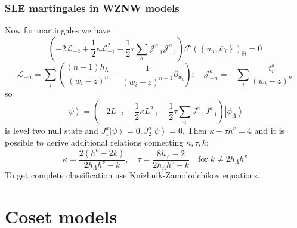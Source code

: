 \documentclass[pdftex]{beamer}
\theoremstyle{definition} \newtheorem{Def}{Definition}
\begin{document}
\begin{frame}
  \frametitle{SLE martingales in WZNW models}
  Now for martingales we have
  \begin{equation*}
    \left(-2 \mathcal{L}_{-2}+\frac{1}{2}\kappa \mathcal{L}_{-1}^{2}+\frac{1}{2}\tau\sum_{a} \mathcal{J}^{a}_{-1} \mathcal{J}^{a}_{-1}\right)        \mathcal{F}(\left\{w_{i}, \bar w_{i}\right\})_{\mathbb{H}}=0
  \end{equation*}
  \begin{equation*}
    \mathcal{L}_{-n}=\sum_{i}\left(\frac{(n-1)h_{\lambda_{i}}}{(w_{i}-z)^{n}}-\frac{1}{(w_{i}-z)^{n-1}}\partial_{w_{i}}\right);\quad \mathcal{J}^{a}_{{-n}}=-\sum_{i}\frac{t^{a}_{i}}{(w_{i}-z)^{n}}
  \end{equation*}
  so 
  \begin{equation*}
\left| \psi\right>=\left(-2 L_{-2}+\frac{1}{2}\kappa L_{-1}^{2}+\frac{1}{2}\tau\sum_{a} J^{a}_{-1} J^{a}_{-1}\right) \left|\phi_{\Lambda}\right>    
  \end{equation*}
 is level two null state and $J^{a}_{1} \left|\psi\right>=0, J^{a}_{2}\left|\psi\right>=0$. Then $\kappa+\tau h^{v}=4$ and it is possible to derive additional relations connecting $\kappa, \tau, k$:
 \begin{equation*}
   \kappa=\frac{2(h^{v}-2k)}{2h_{\Lambda}h^{v}-k},\quad \tau=\frac{8 h_{\Lambda}-2}{2h_{\Lambda}h^{v}-k}  \quad\text{for}\; k\neq 2h_{\Lambda}h^{v}
 \end{equation*}
 To get complete classification use Knizhnik-Zamolodchikov equations.
\end{frame}

\section{Coset models}
\label{sec:coset-models}
\end{document}
